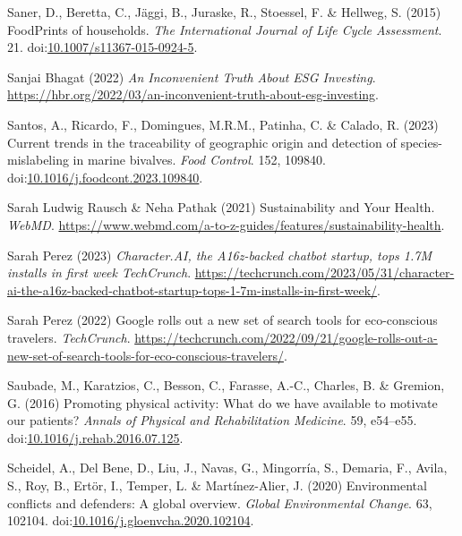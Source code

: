 \documentclass[
  letterpaper,
  DIV=11,
  numbers=noendperiod]{scrartcl}
\newlength{\cslhangindent}
\newenvironment{CSLReferences}[2] %
 {\begin{list}{}{%
  \setlength{\itemindent}{0pt}
  \setlength{\leftmargin}{0pt}
  \setlength{\parsep}{0pt}
  \ifodd #1
   \setlength{\leftmargin}{\cslhangindent}
   \setlength{\itemindent}{-1\cslhangindent}
  \fi
  \setlength{\itemsep}{#2\baselineskip}}}
 {\end{list}}
\begin{document}
\begin{CSLReferences}{0}{1}
Saner, D., Beretta, C., Jäggi, B., Juraske, R., Stoessel, F. \& Hellweg,
S. (2015) {FoodPrints} of households. \emph{The International Journal of
Life Cycle Assessment}. 21.
doi:\href{https://doi.org/10.1007/s11367-015-0924-5}{10.1007/s11367-015-0924-5}.

Sanjai Bhagat (2022) \emph{An {Inconvenient Truth About ESG Investing}}.
\url{https://hbr.org/2022/03/an-inconvenient-truth-about-esg-investing}.

Santos, A., Ricardo, F., Domingues, M.R.M., Patinha, C. \& Calado, R.
(2023) Current trends in the traceability of geographic origin and
detection of species-mislabeling in marine bivalves. \emph{Food
Control}. 152, 109840.
doi:\href{https://doi.org/10.1016/j.foodcont.2023.109840}{10.1016/j.foodcont.2023.109840}.

Sarah Ludwig Rausch \& Neha Pathak (2021) Sustainability and {Your
Health}. \emph{WebMD}.
\url{https://www.webmd.com/a-to-z-guides/features/sustainability-health}.

Sarah Perez (2023) \emph{Character.{AI}, the A16z-backed chatbot
startup, tops 1.{7M} installs in first week {\textbar} {TechCrunch}}.
\url{https://techcrunch.com/2023/05/31/character-ai-the-a16z-backed-chatbot-startup-tops-1-7m-installs-in-first-week/}.

Sarah Perez (2022) Google rolls out a new set of search tools for
eco-conscious travelers. \emph{TechCrunch}.
\url{https://techcrunch.com/2022/09/21/google-rolls-out-a-new-set-of-search-tools-for-eco-conscious-travelers/}.

Saubade, M., Karatzios, C., Besson, C., Farasse, A.-C., Charles, B. \&
Gremion, G. (2016) Promoting physical activity: {What} do we have
available to motivate our patients? \emph{Annals of Physical and
Rehabilitation Medicine}. 59, e54--e55.
doi:\href{https://doi.org/10.1016/j.rehab.2016.07.125}{10.1016/j.rehab.2016.07.125}.

Scheidel, A., Del Bene, D., Liu, J., Navas, G., Mingorría, S., Demaria,
F., Avila, S., Roy, B., Ertör, I., Temper, L. \& Martínez-Alier, J.
(2020) Environmental conflicts and defenders: {A} global overview.
\emph{Global Environmental Change}. 63, 102104.
doi:\href{https://doi.org/10.1016/j.gloenvcha.2020.102104}{10.1016/j.gloenvcha.2020.102104}.


\end{CSLReferences}
\end{document}

